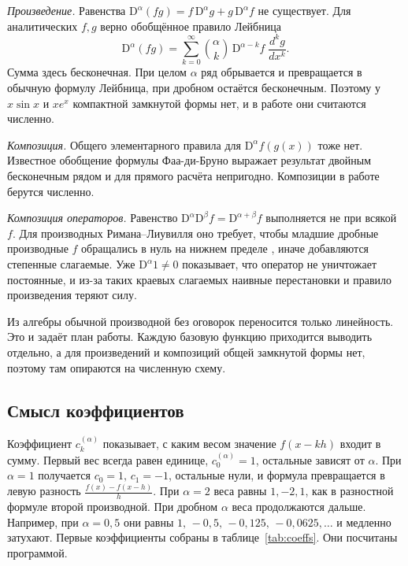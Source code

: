 \documentclass[14pt,a4paper]{extarticle}
\newcommand{\D}{\mathrm{D}}
\begin{document}
\textit{Произведение.} Равенства $\D^{\alpha}(fg)=f\,\D^{\alpha}g+g\,\D^{\alpha}f$ не существует. Для аналитических $f,g$ верно обобщённое правило Лейбница \cite{podlubny, samko}
\begin{equation}
\D^{\alpha}(fg)=\sum_{k=0}^{\infty}\binom{\alpha}{k}\,\D^{\alpha-k}f\;\frac{d^k g}{dx^k}.
\label{eq:leibniz}
\end{equation}
Сумма здесь бесконечная. При целом $\alpha$ ряд обрывается и превращается в обычную формулу Лейбница, при дробном остаётся бесконечным. Поэтому у $x\sin x$ и $xe^{x}$ компактной замкнутой формы нет, и в работе они считаются численно.

\textit{Композиция.} Общего элементарного правила для $\D^{\alpha}f(g(x))$ тоже нет. Известное обобщение формулы Фаа-ди-Бруно выражает результат двойным бесконечным рядом \cite{samko} и для прямого расчёта непригодно. Композиции в работе берутся численно.

\textit{Композиция операторов.} Равенство $\D^{\alpha}\D^{\beta}f=\D^{\alpha+\beta}f$ выполняется не при всякой $f$. Для производных Римана--Лиувилля оно требует, чтобы младшие дробные производные $f$ обращались в нуль на нижнем пределе \cite{podlubny, samko}, иначе добавляются степенные слагаемые. Уже $\D^{\alpha}1\ne0$ показывает, что оператор не уничтожает постоянные, и из-за таких краевых слагаемых наивные перестановки и правило произведения теряют силу.

Из алгебры обычной производной без оговорок переносится только линейность. Это и задаёт план работы. Каждую базовую функцию приходится выводить отдельно, а для произведений и композиций общей замкнутой формы нет, поэтому там опираются на численную схему.

\subsection{Смысл коэффициентов}

Коэффициент $c_k^{(\alpha)}$ показывает, с каким весом значение $f(x-kh)$ входит в сумму. Первый вес всегда равен единице, $c_0^{(\alpha)}=1$, остальные зависят от $\alpha$. При $\alpha=1$ получается $c_0=1,\,c_1=-1$, остальные нули, и формула превращается в левую разность $\frac{f(x)-f(x-h)}{h}$. При $\alpha=2$ веса равны $1,-2,1$, как в разностной формуле второй производной. При дробном $\alpha$ веса продолжаются дальше. Например, при $\alpha=0{,}5$ они равны $1,\,-0{,}5,\,-0{,}125,\,-0{,}0625,\dots$ и медленно затухают. Первые коэффициенты собраны в таблице~\ref{tab:coeffs}. Они посчитаны программой.
\end{document}

